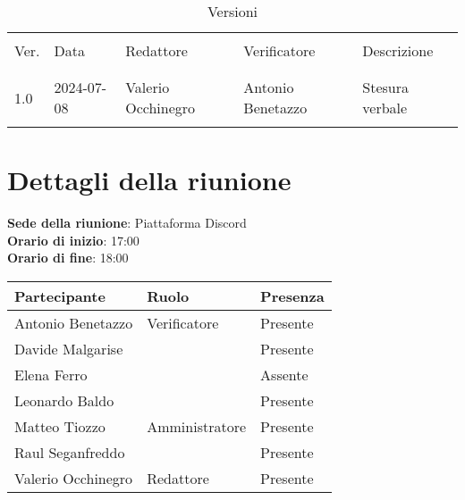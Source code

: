 \documentclass[italian,12pt]{article}
\begin{document}
\newcommand{\mySkip}[1][]{#1}



\newpage



\begin{table}[!h]
	\caption{Versioni}
	\footnotesize
	\begin{center}
		\begin{tabular}{ l l l l p{6cm} }
			\hline                                                                      \\[-2ex]
			Ver. & Data       & Redattore          & Verificatore       & Descrizione     \\
			\\[-2ex] \hline \\[-1.5ex]
			1.0  & 2024-07-08 & Valerio Occhinegro & Antonio Benetazzo  & Stesura verbale \\
			\\[-1.5ex] \hline
		\end{tabular}
	\end{center}
\end{table}

\newpage

\tableofcontents

\newpage

\section{Dettagli della riunione}

\textbf{Sede della riunione}: Piattaforma Discord\\
\textbf{Orario di inizio}: 17:00\\
\textbf{Orario di fine}: 18:00\\

\begin{flushleft}
	\begin{table}[!h]
		\begin{tabular}{ |l|l|l| }
			\hline
			\textbf{Partecipante} & \textbf{Ruolo} & \textbf{Presenza} \\
			\hline
			Antonio Benetazzo     & Verificatore   & Presente          \\
			Davide Malgarise      &                & Presente          \\
			Elena Ferro           &                & Assente           \\
			Leonardo Baldo        &                & Presente          \\
			Matteo Tiozzo         & Amministratore & Presente          \\
			Raul Seganfreddo      &                & Presente          \\
			Valerio Occhinegro    & Redattore      & Presente          \\
			\hline
		\end{tabular}
	\end{table}
\end{flushleft}
\end{document}
